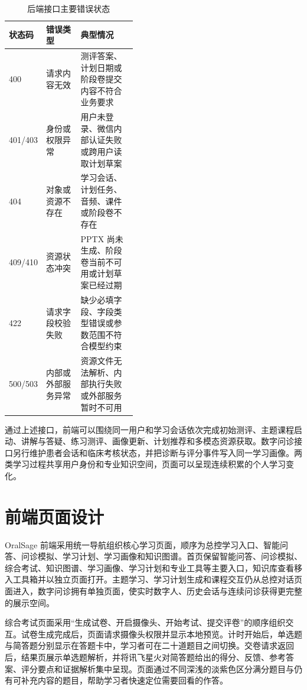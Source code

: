 \begin{table}[H]
  \centering
  \caption{后端接口主要错误状态}
  \label{tab:backend-error-codes}
  \begin{tabularx}{\linewidth}{p{0.16\linewidth}p{0.27\linewidth}X}
    \toprule
    状态码 & 错误类型 & 典型情况 \\
    \midrule
    400 & 请求内容无效
        & 测评答案、计划日期或阶段卷提交内容不符合业务要求 \\
    401/403 & 身份或权限异常
        & 用户未登录、微信内部认证失败或跨用户读取计划草案 \\
    404 & 对象或资源不存在
        & 学习会话、计划任务、音频、课件或阶段卷不存在 \\
    409/410 & 资源状态冲突
        & PPTX 尚未生成、阶段卷当前不可用或计划草案已经过期 \\
    422 & 请求字段校验失败
        & 缺少必填字段、字段类型错误或参数范围不符合模型约束 \\
    500/503 & 内部或外部服务异常
        & 资源文件无法解析、内部执行失败或外部服务暂时不可用 \\
    \bottomrule
  \end{tabularx}
\end{table}

通过上述接口，前端可以围绕同一用户和学习会话依次完成初始测评、主题课程启动、讲解与答疑、练习测评、画像更新、计划推荐和多模态资源获取。数字问诊接口另行维护患者会话和临床考核状态，并把诊断与评分事件写入同一学习画像。两类学习过程共享用户身份和专业知识空间，页面可以呈现连续积累的个人学习变化。

\section{前端页面设计}

OralSage 前端采用统一导航组织核心学习页面，顺序为总控学习入口、智能问答、问诊模拟、学习计划、学习画像和知识图谱。首页保留智能问答、问诊模拟、综合考试、知识图谱、学习画像、学习计划和专业工具等主要入口，知识库查看移入工具箱并以独立页面打开。主题学习、学习计划生成和课程交互仍从总控对话页面进入，数字问诊拥有单独页面，使实时数字人、历史会话与连续问诊获得更完整的展示空间。

综合考试页面采用“生成试卷、开启摄像头、开始考试、提交评卷”的顺序组织交互。试卷生成完成后，页面请求摄像头权限并显示本地预览。计时开始后，单选题与简答题分别显示在答题卡中，学习者可在二十道题目之间切换。交卷请求返回后，结果页展示单选题解析，并将讯飞星火对简答题给出的得分、反馈、参考答案、评分要点和证据解析集中呈现。页面通过不同深浅的淡紫色区分满分题目与仍有可补充内容的题目，帮助学习者快速定位需要回看的作答。

